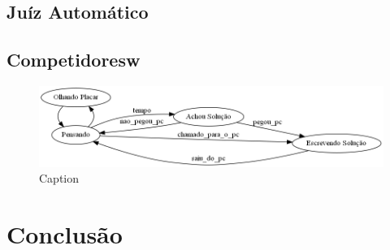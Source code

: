 \documentclass[11pt]{article}
\begin{document}
\subsection{Juíz Automático}

\subsection{Competidoresw}

\begin{figure}[h]
    \centering
    \includegraphics{fsm.png}
    \caption{Caption}
    \label{fig:my_label}
\end{figure}



\section{Conclusão}


\medskip
\printbibliography
\end{document}
